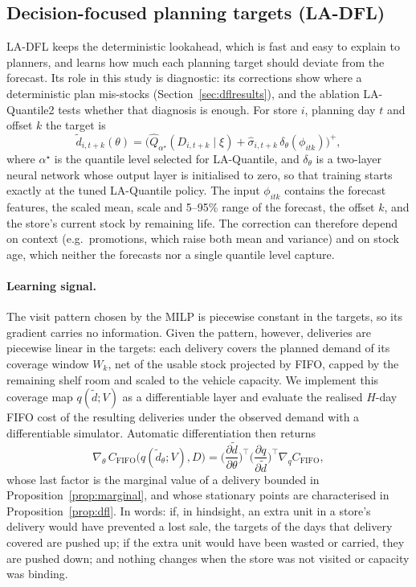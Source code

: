 \subsection{Decision-focused planning targets (LA-DFL)}\label{sec:dfl}

LA-DFL keeps the deterministic lookahead, which is fast and easy to explain to planners, and learns how much each planning target should deviate from the forecast. Its role in this study is diagnostic: its corrections show where a deterministic plan mis-stocks (Section~\ref{sec:dflresults}), and the ablation LA-Quantile2 tests whether that diagnosis is enough. For store $i$, planning day $t$ and offset $k$ the target is
\begin{equation}\label{eq:target}
\tilde d_{i,t+k}(\theta)=\Big(\hat Q_{\alpha^\star}(D_{i,t+k}\mid\xi)+\hat\sigma_{i,t+k}\,\delta_\theta(\phi_{itk})\Big)^{+},
\end{equation}
where $\alpha^\star$ is the quantile level selected for LA-Quantile, and $\delta_\theta$ is a two-layer neural network whose output layer is initialised to zero, so that training starts exactly at the tuned LA-Quantile policy. The input $\phi_{itk}$ contains the forecast features, the scaled mean, scale and 5--95\% range of the forecast, the offset $k$, and the store's current stock by remaining life. The correction can therefore depend on context (e.g.\ promotions, which raise both mean and variance) and on stock age, which neither the forecasts nor a single quantile level capture.

\paragraph{Learning signal.} The visit pattern chosen by the MILP is piecewise constant in the targets, so its gradient carries no information. Given the pattern, however, deliveries are piecewise linear in the targets: each delivery covers the planned demand of its coverage window $W_k$, net of the usable stock projected by FIFO, capped by the remaining shelf room and scaled to the vehicle capacity. We implement this coverage map $q(\tilde d;V)$ as a differentiable layer and evaluate the realised $H$-day FIFO cost of the resulting deliveries under the observed demand with a differentiable simulator. Automatic differentiation then returns
\begin{equation}\label{eq:grad}
\nabla_\theta\, C_{\mathrm{FIFO}}\big(q(\tilde d_\theta;V),D\big)=\Big(\frac{\partial \tilde d}{\partial\theta}\Big)^{\!\top}\Big(\frac{\partial q}{\partial \tilde d}\Big)^{\!\top}\nabla_q C_{\mathrm{FIFO}},
\end{equation}
whose last factor is the marginal value of a delivery bounded in Proposition~\ref{prop:marginal}, and whose stationary points are characterised in Proposition~\ref{prop:dfl}. In words: if, in hindsight, an extra unit in a store's delivery would have prevented a lost sale, the targets of the days that delivery covered are pushed up; if the extra unit would have been wasted or carried, they are pushed down; and nothing changes when the store was not visited or capacity was binding.

